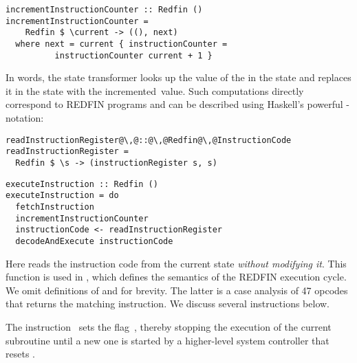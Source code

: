 \begin{verbatim}
incrementInstructionCounter :: Redfin ()
incrementInstructionCounter =
    Redfin $ \current -> ((), next)
  where next = current { instructionCounter =
          instructionCounter current + 1 }
\end{verbatim}

\noindent
In words, the state transformer looks up the value of the 
in the  state and replaces it in the  state with the
incremented~value. Such computations directly correspond to REDFIN programs and
can be described using Haskell's powerful -notation:



\begin{verbatim}
readInstructionRegister@\,@::@\,@Redfin@\,@InstructionCode
readInstructionRegister =
  Redfin $ \s -> (instructionRegister s, s)
\end{verbatim}
\vspace{0.5mm}
\begin{verbatim}
executeInstruction :: Redfin ()
executeInstruction = do
  fetchInstruction
  incrementInstructionCounter
  instructionCode <- readInstructionRegister
  decodeAndExecute instructionCode
\end{verbatim}

\noindent
Here  reads the instruction code from the current
state \emph{without modifying it}. This function is used in ,
which defines the semantics of the REDFIN execution cycle. We omit definitions of
 and  for brevity. The latter is a
case analysis of 47 opcodes that returns the matching instruction. We discuss
several instructions below.

The instruction~ sets the flag~, thereby stopping the
execution of the current subroutine until a new one is started by a higher-level
system controller that resets .

